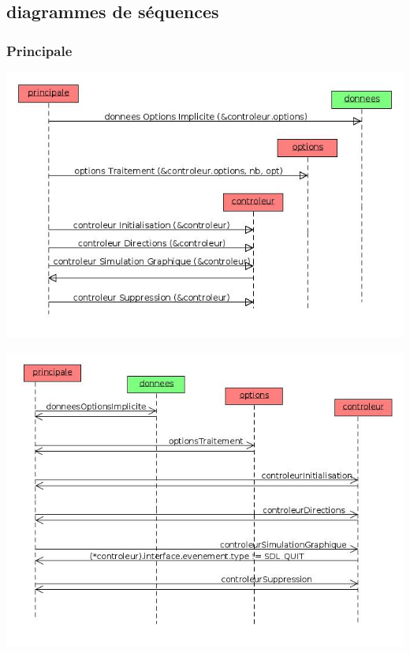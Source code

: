 \subsection{diagrammes de séquences}
%
%
\subsubsection{Principale}
\includegraphics[width=.95\textwidth]{./illustration/sequenceInitialisationPrincipale}

\vspace{.91cm}
\includegraphics[width=.95\textwidth]{./illustration/sequencePrincipale2}
%
